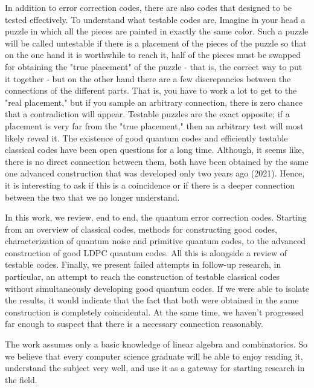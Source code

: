 In addition to error correction codes, there are also codes that designed to be tested effectively. To understand what testable codes are,  Imagine in your head a puzzle in which all the pieces are painted in exactly the same color. Such a puzzle will be called untestable if there is a placement of the pieces of the puzzle so that on the one hand it is worthwhile to reach it, half of the pieces must be swapped for obtaining  the "true placement" of the puzzle - that is, the correct way to put it together - but on the other hand there are a few discrepancies between the connections of the different parts. That is, you have to work a lot to get to the "real placement," but if you sample an arbitrary connection, there is zero chance that a contradiction will appear. Testable puzzles are the exact opposite; if a placement is very far from the "true placement," then an arbitrary test will most likely reveal it. The existence of good quantum codes and efficiently testable classical codes have been open questions for a long time. Although, it seems like, there is no direct connection between them, both have been obtained by the same one advanced construction that was developed only two years ago (2021). Hence, it is interesting to ask if this is a coincidence or if there is a deeper connection between the two that we no longer understand.

In this work, we review, end to end, the quantum error correction codes. Starting from an overview of classical codes, methods for constructing good codes, characterization of quantum noise and primitive quantum codes, to the advanced construction of good LDPC quantum codes. All this is alongside a review of testable codes. Finally, we present failed attempts in follow-up research, in particular, an attempt to reach the construction of testable classical codes without simultaneously developing good quantum codes. If we were able to isolate the results, it would indicate that the fact that both were obtained in the same construction is completely coincidental. At the same time, we haven't progressed far enough to suspect that there is a necessary connection reasonably.

The work assumes only a basic knowledge of linear algebra and combinatorics. So we believe that every computer science graduate will be able to enjoy reading it, understand the subject very well, and use it as a gateway for starting research in the field.


